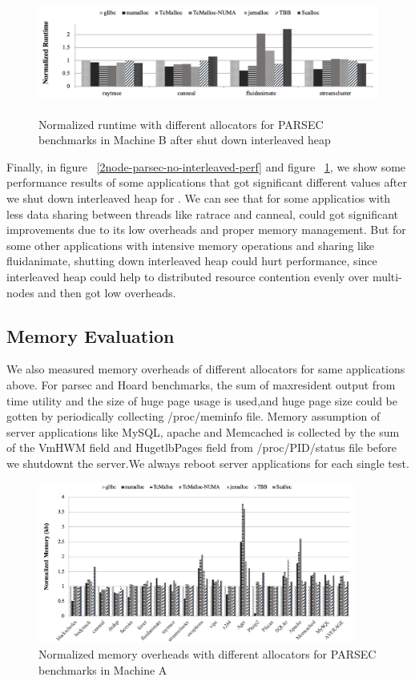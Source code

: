 \begin{figure}[H]
    \centering
    \includegraphics[width=\textwidth,height=150]{figure/8-node-no-interleaved.png}
    \caption{Normalized runtime with different allocators for PARSEC benchmarks in Machine B after shut down interleaved heap}
    \label{8node-parsec-no-interleaved-perf}
\end{figure}
Finally, in figure ~\ref{2node-parsec-no-interleaved-perf} and figure ~\ref{8node-parsec-no-interleaved-perf}, we show some performance results of some applications that got significant different values after we shut down interleaved heap for \NM{}. We can see that for some applicatios with less data sharing between threads like ratrace and canneal, \NM{} could got significant improvements due to its low overheads and proper memory management. But for some other applications with intensive memory operations and sharing like fluidanimate, shutting down interleaved heap could hurt performance, since interleaved heap could help to distributed resource contention evenly over multi-nodes and then got low overheads.

\subsection{Memory Evaluation}
We also measured memory overheads of different allocators for same applications above. For parsec and Hoard benchmarks, the sum of maxresident output from time utility and the size of huge page usage is used,and huge page size could be gotten by periodically collecting /proc/meminfo file. Memory assumption of server applications like MySQL, apache and Memcached is collected by the sum of the VmHWM field and HugetlbPages field from /proc/PID/status file before we shutdownt the server.We always reboot server applications for each single test. 

\begin{figure}[H]
    \centering
    \includegraphics[width=\textwidth,height=200]{figure/2-node-parsec-mem.png}
    \caption{Normalized memory overheads with different allocators for PARSEC benchmarks in Machine A}
    \label{2node-parsec-mem}
\end{figure}

